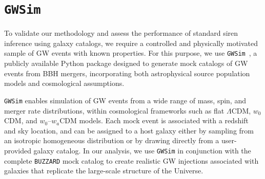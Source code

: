 \section{\texttt{GWSim}}
To validate our methodology and assess the performance of standard siren inference using galaxy catalogs, we require a controlled and physically motivated sample of \ac{GW} events with known properties. For this purpose, we use \texttt{\texttt{GWSim}}~\citep{karathanasis2023gwsim}, a publicly available Python package designed to generate mock catalogs of \ac{GW} events from \ac{BBH} mergers, incorporating both astrophysical source population models and cosmological assumptions.

\texttt{\texttt{GWSim}} enables simulation of \ac{GW} events from a wide range of mass, spin, and merger rate distributions, within cosmological frameworks such as flat $\Lambda$CDM, $w_0$CDM, and $w_0\text{--}w_a$CDM models. Each mock event is associated with a redshift and sky location, and can be assigned to a host galaxy either by sampling from an isotropic homogeneous distribution or by drawing directly from a user-provided galaxy catalog. In our analysis, we use \texttt{\texttt{GWSim}} in conjunction with the complete \texttt{BUZZARD} mock catalog to create realistic \ac{GW} injections associated with galaxies that replicate the large-scale structure of the Universe.

